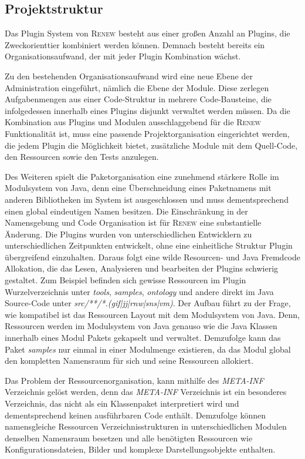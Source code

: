 	\subsection{Projektstruktur} \label{sub:projektstrukutr}
		Das Plugin System von \textsc{Renew} besteht aus einer großen Anzahl an Plugins, die Zweckorienttier kombiniert werden können. Demnach besteht bereits ein Organisationsaufwand, der mit jeder Plugin Kombination wächst. \bigbreak

		Zu den bestehenden Organisationsaufwand wird eine neue Ebene der Administration eingeführt, nämlich die Ebene der Module. Diese zerlegen Aufgabenmengen aus einer Code-Struktur in mehrere Code-Bausteine, die infolgedessen innerhalb eines Plugins disjunkt verwaltet werden müssen.\newline
		Da die Kombination aus Plugins und Modulen ausschlaggebend für die \textsc{Renew} Funktionalität ist, muss eine passende Projektorganisation eingerichtet werden, die jedem Plugin die Möglichkeit bietet, zusätzliche Module mit dem Quell-Code, den Ressourcen sowie den Tests anzulegen.\bigbreak

		Des Weiteren spielt die Paketorganisation eine zunehmend stärkere Rolle im Modulsystem von Java, denn eine Überschneidung eines Paketnamens mit anderen Bibliotheken im System ist ausgeschlossen und muss dementsprechend einen global eindeutigen Namen besitzen. \newline
		Die Einschränkung in der Namensgebung und Code Organisation ist für \textsc{Renew} eine substantielle Änderung. Die Plugins wurden von unterschiedlichen Entwicklern zu unterschiedlichen Zeitpunkten entwickelt, ohne eine einheitliche Struktur Plugin übergreifend einzuhalten. Daraus folgt eine wilde Resourcen- und Java Fremdcode Allokation, die das Lesen, Analysieren und bearbeiten der Plugins schwierig gestaltet. Zum Beispiel befinden sich gewisse Ressourcen im Plugin Wurzelverzeichnis unter \textit{tools}, \textit{samples}, \textit{ontology} und andere direkt im Java Source-Code unter \textit{src/**/*.(gif|jj|rnw|sns|vm)}. Der Aufbau führt zu der Frage, wie kompatibel ist das Ressourcen Layout mit dem Modulsystem von Java. Denn, Ressourcen werden im Modulsystem von Java genauso wie die Java Klassen innerhalb eines Modul Pakets gekapselt und verwaltet. Demzufolge kann das Paket \textit{samples} nur einmal in einer Modulmenge existieren, da das Modul global den kompletten Namensraum für sich und seine Ressourcen allokiert. \bigbreak 

		Das Problem der Ressourcenorganisation, kann mithilfe des \textit{META-INF} Verzeichnis gelöst werden, denn das \textit{META-INF} Verzeichnis ist ein besonderes Verzeichnis, das nicht als ein Klassenpaket interpretiert wird und dementsprechend keinen ausführbaren Code enthält. Demzufolge können namensgleiche Ressourcen Verzeichnisstrukturen in unterschiedlichen Modulen denselben Namensraum besetzen und alle benötigten Ressourcen wie Konfigurationsdateien, Bilder und komplexe Darstellungsobjekte enthalten.\bigbreak

